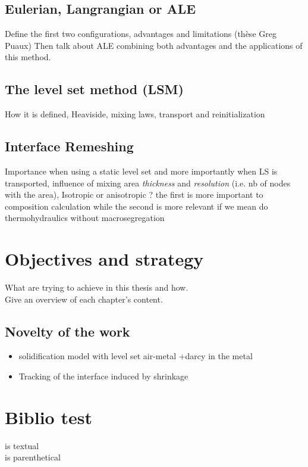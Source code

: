\subsection{Eulerian, Langrangian or ALE}
Define the first two configurations, advantages and limitations (thèse Greg Puaux)
Then talk about ALE combining both advantages and the applications of this method.
\subsection{The level set method (LSM)}
How it is defined, Heaviside, mixing laws, transport and reinitialization
\subsection{Interface Remeshing}
Importance when using a static level set and more importantly when LS is transported,
influence of mixing area \emph{thickness} and \emph{resolution} (i.e. nb of nodes with the area),
Isotropic or anisotropic ? the first is more important to composition calculation while the second
is more relevant if we mean do thermohydraulics without macrosegregation

\section{Objectives and strategy}
What are trying to achieve in this thesis and how. \\
Give an overview of each chapter's content.

\subsection*{Novelty of the work}
\begin{itemize}
\item solidification model with level set air-metal +darcy in the metal
\item Tracking of the interface induced by shrinkage
\end{itemize}

\section{Biblio test}
\citet{carozzani_direct_2013} is textual \\
\citep{carozzani_direct_2013} is parenthetical \\
\citep{ahmad_numerical_1998} \\ 
\citep{beckermann_modelling_2002}
